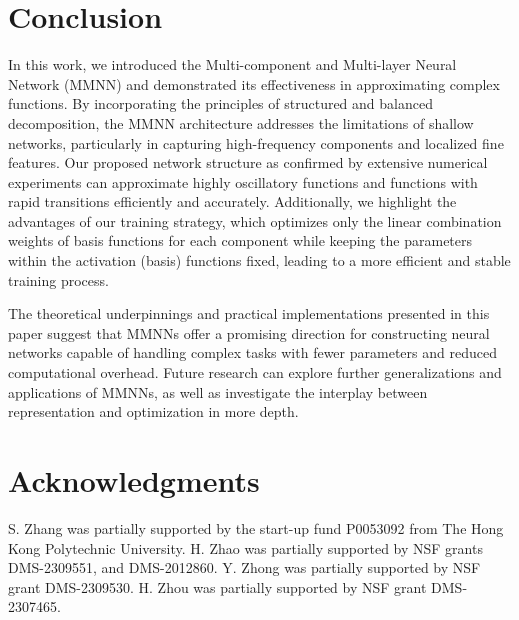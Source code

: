\documentclass[review,hidelinks,onefignum,onetabnum]{siamart250211}
\begin{document}
\section{Conclusion}
\label{sec:conclusion}

In this work, we introduced the Multi-component and Multi-layer Neural Network (MMNN) and demonstrated its effectiveness in approximating complex functions. By incorporating the principles of structured and balanced decomposition, the MMNN architecture addresses the limitations of shallow networks, particularly in capturing high-frequency components and localized fine features. Our proposed network structure as confirmed by extensive numerical experiments can approximate highly oscillatory functions and functions with rapid transitions efficiently and accurately. Additionally, we highlight the advantages of our training strategy, which optimizes only the linear combination weights of basis functions for each component while keeping the parameters within the activation (basis) functions fixed, leading to a more efficient and stable training process.

The theoretical underpinnings and practical implementations presented in this paper suggest that MMNNs offer a promising direction for constructing neural networks capable of handling complex tasks with fewer parameters and reduced computational overhead. Future research can explore further generalizations and applications of MMNNs, as well as investigate the interplay between representation and optimization in more depth.

\section*{Acknowledgments}

S. Zhang was partially supported by the 
start-up fund P0053092
from The Hong Kong Polytechnic University.
H. Zhao was partially supported by NSF grants DMS-2309551, and DMS-2012860. Y. Zhong was partially supported by NSF grant DMS-2309530. H. Zhou was partially supported by NSF grant DMS-2307465.



% 
% 
{
\small
\let\oldhref\href
\def\href#1#2{\oldhref{#1}{\nolinkurl{#2}}}
% 
% 
   

}
\end{document}
